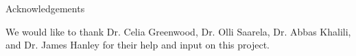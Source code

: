 \documentclass[final]{beamer}
\newcounter{acolumn}%
\def\autoheight{\vspace*{0pt}}%
\begin{document}
\begin{frame}
\begin{acolumns}[t]
\begin{column}{.24\linewidth}
        \end{column}
        
        
         \begin{column}{.24\linewidth}
                 
          \begin{block}{Acknowledgements}
             \begin{center}
             We would like to thank Dr. Celia Greenwood, Dr. Olli Saarela, Dr. Abbas Khalili, and Dr. James Hanley for their help and input on this project.
             \end{center}
             
           \autoheight   
          \end{block}
                              
         \end{column}
        
        
        \end{acolumns}
    
    \vfill 
  \end{frame}
\end{document}
